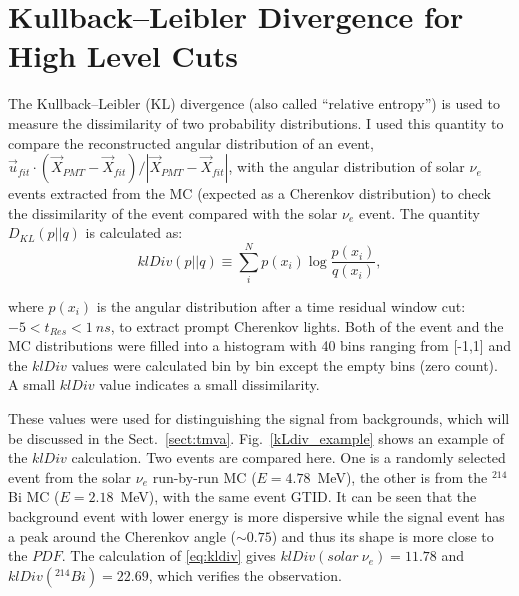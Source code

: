 \section{Kullback–Leibler Divergence for High Level Cuts}

The Kullback–Leibler (KL) divergence (also called ``relative entropy'') is used to measure the dissimilarity of two probability distributions\cite{murphy2012machine}. I used this quantity to compare the reconstructed angular distribution of an event, $\vec{u}_{fit}\cdot(\vec{X}_{PMT}-\vec{X}_{fit})/|\vec{X}_{PMT}-\vec{X}_{fit}|$, with the angular distribution of solar $\nu_e$ events extracted from the MC (expected as a Cherenkov distribution) to check the dissimilarity of the event compared with the solar $\nu_e$ event. The quantity $D_{KL}(p||q)$ is calculated as: 
\begin{equation}\label{eq:kldiv}
klDiv(p||q) \equiv \sum_{i}^N p(x_i)\log{\frac{p(x_i)}{q(x_i)}},
\end{equation}

where $p(x_i)$ is the angular distribution after a time residual window cut: $-5<t_{Res}<1~ns$, to extract prompt Cherenkov lights. Both of the event and the MC distributions were filled into a histogram with 40 bins ranging from [-1,1] and the $klDiv$ values were calculated bin by bin except the empty bins (zero count). A small $klDiv$ value indicates a small dissimilarity.

These values were used for distinguishing the signal from backgrounds, which will be discussed in the Sect.~\ref{sect:tmva}. Fig.~\ref{kLdiv_example} shows an example of the $klDiv$ calculation. Two events are compared here. One is a randomly selected event from the solar $\nu_e$ run-by-run MC ($E=4.78$~MeV), the other is from the $^{214}$Bi MC ($E=2.18$~MeV), with the same event GTID. It can be seen that the background event with lower energy is more dispersive while the signal event has a peak around the Cherenkov angle ($\sim 0.75$) and thus its shape is more close to the $PDF$. The calculation of \ref{eq:kldiv} gives $klDiv(solar~\nu_e)=11.78$ and $klDiv(^{214}Bi)=22.69$, which verifies the observation.

